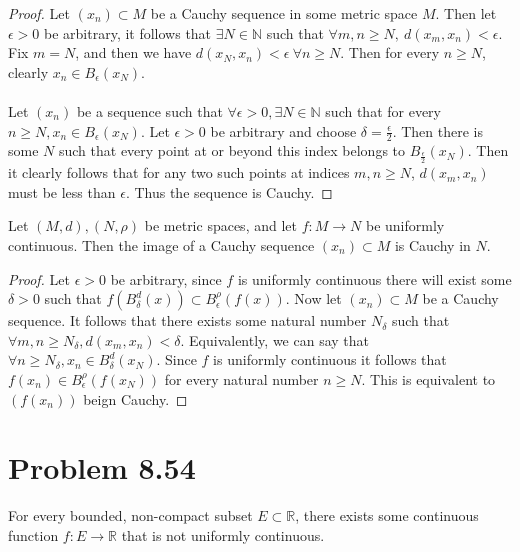 \documentclass{article}
\theoremstyle{definition}
\begin{document}
    \begin{proof}
        \fbox{$\Rightarrow$} Let $(x_n) \subset M$ be a Cauchy sequence in some metric space $M$. Then let $\epsilon > 0$ be arbitrary,
        it follows that $\exists N \in \mathbb{N}$ such that $\forall m,n \geqslant N, \ d(x_m,x_n) < \epsilon$.
        Fix $m = N$, and then we have $d(x_N, x_n) < \epsilon \ \forall n \geqslant N$. Then for every $n \geqslant N$, clearly $x_n \in B_\epsilon(x_N)$.\\\\
        \fbox{$\Leftarrow$} Let $(x_n)$ be a sequence such that $\forall \epsilon > 0, \exists N \in \mathbb{N}$ such that for every $n \geqslant N, x_n \in B_\epsilon(x_N)$.
        Let $\epsilon > 0$ be arbitrary and choose $\delta = \frac{\epsilon}{2}$. Then there is some $N$ such that every point at or beyond this index belongs to $B_{\frac{\epsilon}{2}}(x_N)$.
        Then it clearly follows that for any two such points at indices $m,n \geqslant N$, $d(x_m,x_n)$ must be less than $\epsilon$. Thus the sequence is Cauchy.
    \end{proof}

    \begin{mdframed}
        Let $(M,d), (N, \rho)$ be metric spaces, and let $f:M\rightarrow N$ be uniformly continuous.
        Then the image of a Cauchy sequence $(x_n) \subset M$ is Cauchy in $N$.
    \end{mdframed}
    
    \begin{proof}
        Let $\epsilon > 0$ be arbitrary, since $f$ is uniformly continuous there will exist some $\delta > 0$ such that
        $f(B_\delta^d(x)) \subset B_\epsilon^\rho(f(x))$. Now let $(x_n) \subset M$ be a Cauchy sequence. It follows that 
        there exists some natural number $N_\delta$ such that $\forall m,n \geqslant N_\delta, d(x_m,x_n) < \delta$.
        Equivalently, we can say that $\forall n \geqslant N_\delta, x_n \in B_\delta^d(x_N)$. Since $f$ is uniformly continuous
        it follows that $f(x_n) \in B_\epsilon^\rho(f(x_N))$ for every natural number $n \geqslant N$. This is equivalent to $(f(x_n))$
        beign Cauchy.
    \end{proof}

\section*{Problem 8.54}
    \begin{mdframed}
        For every bounded, non-compact subset $E \subset \mathbb{R}$, there exists some continuous function $f:E \rightarrow \mathbb{R}$
        that is not uniformly continuous.
    \end{mdframed}
\end{document}
